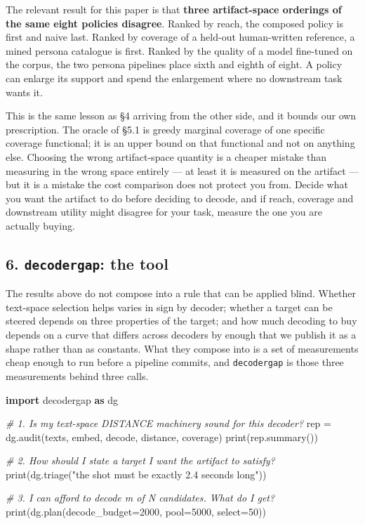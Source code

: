 \documentclass[
  10pt,
]{article}
\newenvironment{Shaded}{}{}
\newcommand{\BuiltInTok}[1]{\textcolor[rgb]{0.00,0.50,0.00}{#1}}
\newcommand{\CommentTok}[1]{\textcolor[rgb]{0.38,0.63,0.69}{\textit{#1}}}
\newcommand{\DecValTok}[1]{\textcolor[rgb]{0.25,0.63,0.44}{#1}}
\newcommand{\ImportTok}[1]{\textcolor[rgb]{0.00,0.50,0.00}{\textbf{#1}}}
\newcommand{\NormalTok}[1]{#1}
\newcommand{\OperatorTok}[1]{\textcolor[rgb]{0.40,0.40,0.40}{#1}}
\newcommand{\StringTok}[1]{\textcolor[rgb]{0.25,0.44,0.63}{#1}}
\theoremstyle{plain}
\theoremstyle{definition}
\begin{document}
The relevant result for this paper is that \textbf{three artifact-space
orderings of the same eight policies disagree}. Ranked by reach, the
composed policy is first and naive last. Ranked by coverage of a
held-out human-written reference, a mined persona catalogue is first.
Ranked by the quality of a model fine-tuned on the corpus, the two
persona pipelines place sixth and eighth of eight. A policy can enlarge
its support and spend the enlargement where no downstream task wants it.

This is the same lesson as §4 arriving from the other side, and it
bounds our own prescription. The oracle of §5.1 is greedy marginal
coverage of one specific coverage functional; it is an upper bound on
that functional and not on anything else. Choosing the wrong
artifact-space quantity is a cheaper mistake than measuring in the wrong
space entirely --- at least it is measured on the artifact --- but it is
a mistake the cost comparison does not protect you from. Decide what you
want the artifact to do before deciding to decode, and if reach,
coverage and downstream utility might disagree for your task, measure
the one you are actually buying.

\subsection{\texorpdfstring{6. \texttt{decodergap}: the
tool}{6. decodergap: the tool}}\label{6-decodergap-the-tool}

The results above do not compose into a rule that can be applied blind.
Whether text-space selection helps varies in sign by decoder; whether a
target can be steered depends on three properties of the target; and how
much decoding to buy depends on a curve that differs across decoders by
enough that we publish it as a shape rather than as constants. What they
compose into is a set of measurements cheap enough to run before a
pipeline commits, and \texttt{decodergap} is those three measurements
behind three calls.

\begin{Shaded}
\begin{Highlighting}[]
\ImportTok{import}\NormalTok{ decodergap }\ImportTok{as}\NormalTok{ dg}

\CommentTok{\# 1. Is my text{-}space DISTANCE machinery sound for this decoder?}
\NormalTok{rep }\OperatorTok{=}\NormalTok{ dg.audit(texts, embed, decode, distance, coverage)}
\BuiltInTok{print}\NormalTok{(rep.summary())}

\CommentTok{\# 2. How should I state a target I want the artifact to satisfy?}
\BuiltInTok{print}\NormalTok{(dg.triage(}\StringTok{"the shot must be exactly 2.4 seconds long"}\NormalTok{))}

\CommentTok{\# 3. I can afford to decode m of N candidates. What do I get?}
\BuiltInTok{print}\NormalTok{(dg.plan(decode\_budget}\OperatorTok{=}\DecValTok{2000}\NormalTok{, pool}\OperatorTok{=}\DecValTok{5000}\NormalTok{, select}\OperatorTok{=}\DecValTok{50}\NormalTok{))}
\end{Highlighting}
\end{Shaded}
\end{document}
